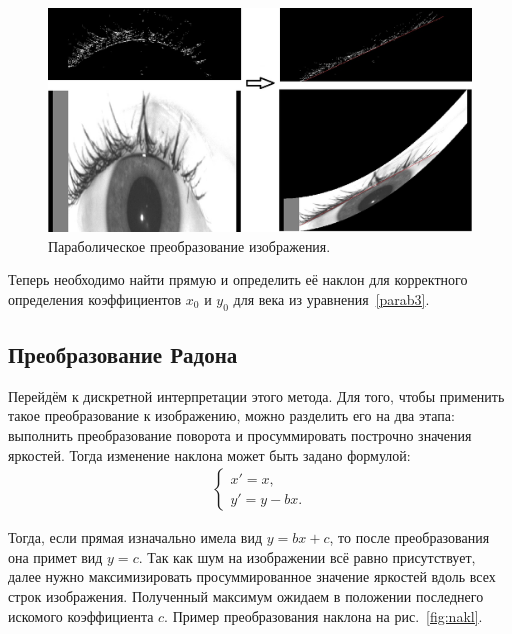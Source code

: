 \documentclass[12pt,a4paper]{article} %
\begin{document}
\begin{figure}[h]
	
	\centering
	
	\includegraphics[width=0.8\linewidth]{parab.jpg}
	
	\caption{Параболическое преобразование изображения.}
	
	\label{fig:parab}
	
\end{figure}

Теперь необходимо найти прямую и определить её наклон для корректного определения коэффициентов $x_0$ и $y_0$ для века из уравнения~\eqref{parab3}.
 
\newpage
\subsection{Преобразование Радона}

Перейдём к дискретной интерпретации этого метода. Для того, чтобы применить такое преобразование к изображению, можно разделить его на два этапа: выполнить преобразование поворота и просуммировать построчно значения яркостей. Тогда изменение наклона может быть задано формулой:
\begin{gather}\label{nakl}
	\begin{cases}
		x' = x,
		\\
		y' = y - bx.
	\end{cases}
\end{gather}

Тогда, если прямая изначально имела вид $y=bx+c$, то после преобразования она примет вид $y = c$. Так как шум на изображении всё равно присутствует, далее нужно максимизировать просуммированное значение яркостей вдоль всех строк изображения. Полученный максимум ожидаем в положении последнего искомого коэффициента $c$. Пример преобразования наклона на рис.~\ref{fig:nakl}.
\end{document}
